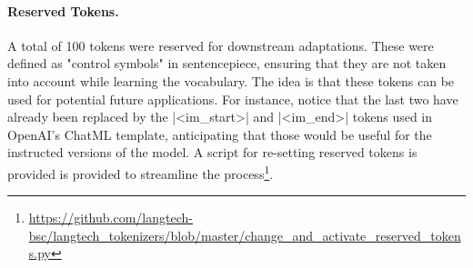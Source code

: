 \paragraph{Reserved Tokens.} A total of 100 tokens were reserved for downstream adaptations. These were defined as "control symbols" in sentencepiece, ensuring that they are not taken into account while learning the vocabulary. The idea is that these tokens can be used for potential future applications. For instance, notice that the last two have already been replaced by the |<im\_start>| and |<im\_end>| tokens used in OpenAI's ChatML template, anticipating that those would be useful for the instructed versions of the model. A script for re-setting reserved tokens is provided is provided to streamline the process\footnote{\url{https://github.com/langtech-bsc/langtech_tokenizers/blob/master/change_and_activate_reserved_tokens.py}}.



\clearpage

